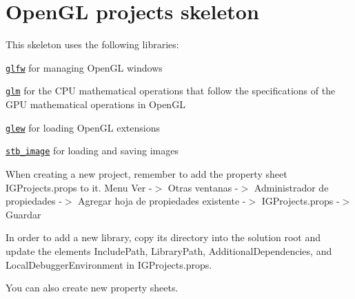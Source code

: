 \chapter{Open\+GL projects skeleton }
\hypertarget{md__r_e_a_d_m_e}{}\label{md__r_e_a_d_m_e}
\label{md__r_e_a_d_m_e_autotoc_md0}%
%


This skeleton uses the following libraries:\+


\begin{DoxyItemize}
\item \href{https://www.glfw.org/}{\texttt{glfw}} for managing Open\+GL windows
\item \href{https://glm.g-truc.net/}{\texttt{glm}} for the CPU mathematical operations that follow the specifications of the GPU mathematical operations in Open\+GL
\item \href{https://glew.sourceforge.net/}{\texttt{glew}} for loading Open\+GL extensions
\item \href{https://github.com/nothings/stb}{\texttt{stb\+\_\+image}} for loading and saving images
\end{DoxyItemize}

When creating a new project, remember to add the property sheet {\ttfamily IGProjects.\+props} to it. Menu Ver -\/\texorpdfstring{$>$}{>} Otras ventanas -\/\texorpdfstring{$>$}{>} Administrador de propiedades -\/\texorpdfstring{$>$}{>} Agregar hoja de propiedades existente -\/\texorpdfstring{$>$}{>} IGProjects.\+props -\/\texorpdfstring{$>$}{>} Guardar

In order to add a new library, copy its directory into the solution root and update the elements {\ttfamily Include\+Path}, {\ttfamily Library\+Path}, {\ttfamily Additional\+Dependencies}, and {\ttfamily Local\+Debugger\+Environment} in {\ttfamily IGProjects.\+props}.

You can also create new property sheets. 
